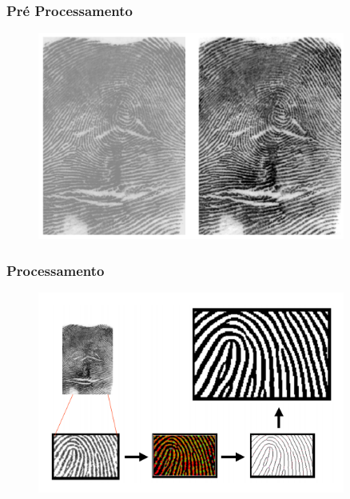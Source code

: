 \documentclass{beamer}
\begin{document}

\begin{frame}
\frametitle{Pré Processamento}

	\begin{figure}[!h]
		\begin{center}
			\includegraphics[width=0.9\textwidth]{Figures/prepros}
		\end{center}
		
	\end{figure}
	
\end{frame}



\begin{frame}
\frametitle{Processamento}

	\begin{figure}[!h]
		\begin{center}
			\includegraphics[width=0.9\textwidth]{Figures/process}
		\end{center}
		
	\end{figure}
	
\end{frame}
\end{document}
